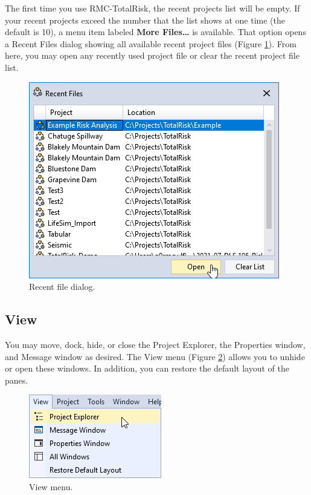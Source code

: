 \documentclass[
]{book}
\begin{document}
The first time you use RMC-TotalRisk, the recent projects list will be empty. If your recent projects exceed the number that the list shows at one time (the default is 10), a menu item labeled \textbf{More Files\ldots{}} is available. That option opens a Recent Files dialog showing all available recent project files (Figure \ref{fig:figure-7}). From here, you may open any recently used project file or clear the recent project file list.

\begin{figure}

{\centering \includegraphics{images/figure7} 

}

\caption{Recent file dialog.}\label{fig:figure-7}
\end{figure}

\hypertarget{gui-menu-bar-view}{%
\subsection{View}\label{gui-menu-bar-view}}

You may move, dock, hide, or close the Project Explorer, the Properties window, and Message window as desired. The View menu (Figure \ref{fig:figure-8}) allows you to unhide or open these windows. In addition, you can restore the default layout of the panes.

\begin{figure}

{\centering \includegraphics{images/figure8} 

}

\caption{View menu.}\label{fig:figure-8}
\end{figure}
\end{document}
